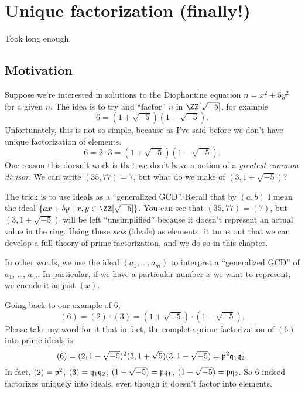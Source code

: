 \chapter{Unique factorization (finally!)}
Took long enough.

\section{Motivation}
Suppose we're interested in solutions to the
Diophantine equation $n = x^2 + 5y^2$ for a given $n$.
The idea is to try and ``factor'' $n$ in $\ZZ[\sqrt{-5}]$,
for example \[ 6 = (1+\sqrt{-5})(1-\sqrt{-5}). \]
Unfortunately, this is not so simple, because as I've said before
we don't have unique factorization of elements.
\[ 6 = 2 \cdot 3 = \left( 1+\sqrt{-5} \right)\left( 1-\sqrt{-5} \right). \]
One reason this doesn't work is that we don't have a notion of a
\emph{greatest common divisor}.
We can write $(35, 77) = 7$, but what do we make of $(3, 1+\sqrt{-5})$?

The trick is to use ideals as a ``generalized GCD''.
Recall that by $(a,b)$ I mean the ideal $\{ax + by \mid x,y \in \ZZ[\sqrt{-5}] \}$.
You can see that $(35, 77) = (7)$,
but $(3, 1+\sqrt{-5})$ will be left ``unsimplified'' because it doesn't
represent an actual value in the ring.
Using these \emph{sets} (ideals) as elements,
it turns out that we can develop a full theory
of prime factorization, and we do so in this chapter.

In other words, we use the ideal $(a_1, \dots, a_m)$
to interpret a ``generalized GCD'' of $a_1$, \dots, $a_m$.
In particular, if we have a particular number $x$ we want to represent,
we encode it as just $(x)$.

Going back to our example of $6$,
\[ (6) = (2) \cdot (3)
	= \left( 1+\sqrt{-5} \right) \cdot \left( 1-\sqrt{-5} \right). \]
Please take my word for it that in fact,
the complete prime factorization of $(6)$ into prime ideals is
\[
	(6)
	= (2,1-\sqrt{-5})^2 (3,1+\sqrt{5})(3,1-\sqrt{-5})
	= \mathfrak p^2 \mathfrak q_1 \mathfrak q_2. \]
In fact, $(2) = \mathfrak p^2$, $(3) = \mathfrak q_1 \mathfrak q_2$,
$(1+\sqrt{-5}) = \mathfrak p \mathfrak q_1$, $(1-\sqrt{-5}) = \mathfrak p \mathfrak q_2$.
So $6$ indeed factorizes uniquely into ideals,
even though it doesn't factor into elements.

